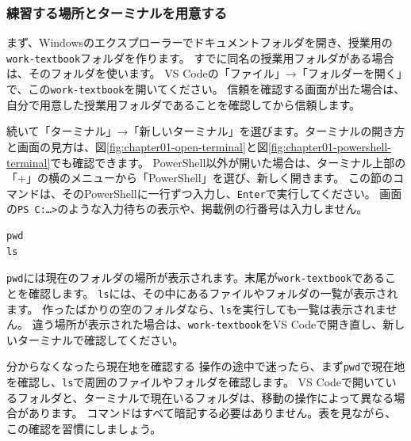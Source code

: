 \subsubsection*{練習する場所とターミナルを用意する}

まず、Windowsのエクスプローラーでドキュメントフォルダを開き、授業用の\texttt{work-textbook}フォルダを作ります。
すでに同名の授業用フォルダがある場合は、そのフォルダを使います。
VS Codeの「ファイル」→「フォルダーを開く」で、この\texttt{work-textbook}を開いてください。
信頼を確認する画面が出た場合は、自分で用意した授業用フォルダであることを確認してから信頼します。

続いて「ターミナル」→「新しいターミナル」を選びます。ターミナルの開き方と画面の見方は、図\ref{fig:chapter01-open-terminal}と図\ref{fig:chapter01-powershell-terminal}でも確認できます。
PowerShell以外が開いた場合は、ターミナル上部の「+」の横のメニューから「PowerShell」を選び、新しく開きます。
この節のコマンドは、そのPowerShellに一行ずつ入力し、\texttt{Enter}で実行してください。
画面の\texttt{PS C:\ldots>}のような入力待ちの表示や、掲載例の行番号は入力しません。

\begin{listing}[H]
\begin{verbatim}
pwd
ls
\end{verbatim}
\caption{現在のフォルダと、その中のファイルを確認する}
\label{lst:chapter01-cli-location}
\end{listing}

\texttt{pwd}には現在のフォルダの場所が表示されます。末尾が\texttt{work-textbook}であることを確認します。
\texttt{ls}には、その中にあるファイルやフォルダの一覧が表示されます。
作ったばかりの空のフォルダなら、\texttt{ls}を実行しても一覧は表示されません。
違う場所が表示された場合は、\texttt{work-textbook}をVS Codeで開き直し、新しいターミナルで確認してください。

\begin{pointbox}{分からなくなったら現在地を確認する}
操作の途中で迷ったら、まず\texttt{pwd}で現在地を確認し、\texttt{ls}で周囲のファイルやフォルダを確認します。
VS Codeで開いているフォルダと、ターミナルで現在いるフォルダは、移動の操作によって異なる場合があります。
コマンドはすべて暗記する必要はありません。表を見ながら、この確認を習慣にしましょう。
\end{pointbox}

